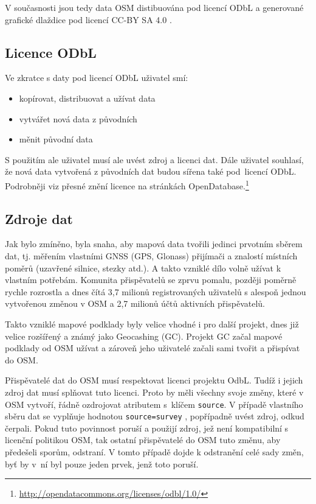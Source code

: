 V současnosti jsou tedy data OSM distibuována pod licencí ODbL a
generované grafické dlaždice pod licencí CC-BY SA 4.0
\cite {OSMlicenceIssue}.

\subsection{Licence ODbL}

Ve zkratce s daty pod licencí ODbL uživatel smí:
\begin{itemize}
    \item    kopírovat, distribuovat a užívat data
    \item    vytvářet nová data z původních
    \item    měnit původní data
\end{itemize}

S použitím ale uživatel musí ale uvést zdroj a licenci dat.
Dále uživatel souhlasí, že nová data vytvořená z původních dat budou sířena
také pod~licencí ODbL.
Podrobněji viz přesné znění licence na stránkách OpenDatabase.\footnote{\url{http://opendatacommons.org/licenses/odbl/1.0/}}


\subsection{Zdroje dat}
\label{Zdroje dat}

Jak bylo zmíněno, byla snaha, aby mapová data tvořili jedinci prvotním
sběrem dat, tj. měřením vlastními GNSS (GPS, Glonass) přijímači a
znalostí místních poměrů (uzavřené silnice, stezky atd.).  A takto
vzniklé dílo volně užívat k vlastním potřebám.  Komunita přispěvatelů se
zprvu pomalu, později poměrně rychle rozrostla a dnes čítá 3,7 milionů
registrovaných uživatelů s alespoň jednou vytvořenou změnou v OSM a
2,7 milionů účtů aktivních přispěvatelů.\cite{OSMstats}

Takto vzniklé mapové podklady byly velice vhodné i pro další projekt, dnes již
velice rozšířený a známý jako Geocashing (GC). Projekt GC začal mapové
podklady od OSM užívat a zároveň jeho uživatelé začali sami tvořit a
přispívat do OSM. 

Přispěvatelé dat do OSM musí respektovat licenci projektu OdbL.
Tudíž i jejich zdroj dat musí splňovat tuto licenci. Proto by měli
všechny svoje změny, které v OSM vytvoří, řádně ozdrojovat atributem
s~klíčem 
{\tt source}.
V případě vlastního sběru dat se vyplňuje hodnotou
{\tt source=survey} ,
popřípadně uvést zdroj, odkud čerpali. Pokud tuto povinnost poruší a
použijí zdroj, jež není kompatibilní s licenční politikou OSM, tak ostatní přispěvatelé do OSM tuto změnu, aby předešeli sporům, odstraní. V tomto případě dojde k odstranění celé sady změn, byť by v~ní byl pouze jeden prvek, jenž toto poruší.

